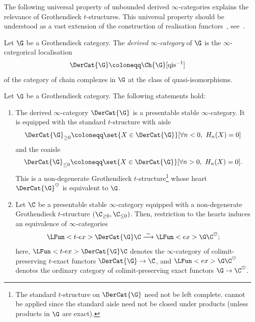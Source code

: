 \documentclass[a4paper]{amsart}
\begin{document}

The following universal property of unbounded derived $\infty$-categories
explains the relevance of Grothendieck $t$-structures. This universal property
should be understood as a vast extension of the construction of realisation
functors~\cite{Bei87,BBDG18}, see~.

\begin{definition}
  \label{def:DerCatG}
  Let $\G$ be a Grothendieck category. The \emph{derived $\infty$-category} of
  $\G$ is the $\infty$-categorical localisation
  \[
    \DerCat{\G}\coloneqq\Ch{\G}[\mathrm{qis}^{-1}]
  \]
  of the category of chain complexes in $\G$ at the class of quasi-isomorphisms.
\end{definition}



\begin{theorem}
  \label{thm:univ-prop-DerCatG}
  Let $\G$ be a Grothendieck category. The following statements hold:
  \begin{enumerate}
  \item The derived $\infty$-category $\DerCat{\G}$ is a presentable stable
    $\infty$-category. It is equipped with the standard $t$-structure with aisle
    \[
      \DerCat{\G}_{\geq0}\coloneqq\set{X\in\DerCat{\G}}[\forall n<0,\ H_n(X)=0]
    \]
    and the coaisle
    \[
      \DerCat{\G}_{\leq0}\coloneqq\set{X\in\DerCat{\G}}[\forall n>0,\ H_n(X)=0].
    \]
    This is a non-degenerate Grothendieck $t$-structure\footnote{The standard
      $t$-structure on $\DerCat{\G}$ need not be left complete.
       cannot be applied since the standard aisle
      need not be closed under products (unless products in $\G$ are exact).}
     whose heart $\DerCat{\G}^\heartsuit$ is equivalent to $\G$.
   \item Let $\C$ be a presentable stable $\infty$-category equipped with a
     non-degenerate Grothendieck $t$-structure $(\C_{\geq0},\C_{\leq0})$. Then,
     restriction to the hearts induces an equivalence of $\infty$-categories
    \[
      \LFun<\text{$t$-}ex>{\DerCat{\G}}{\C}\stackrel{\sim}{\longrightarrow}\LFun<ex>{\G}{\C^\heartsuit};
    \]
    here, $\LFun<\text{$t$-}ex>{\DerCat{\G}}{\C}$ denotes the $\infty$-category
    of colimit-preserving $t$-exact functors $\DerCat{\G}\to\C$, and
    $\LFun<ex>{\G}{\C^\heartsuit}$ denotes the ordinary category of
    co\-li\-mit-preserving exact functors $\G\to\C^\heartsuit$.
  \end{enumerate}
\end{theorem}
\end{document}
